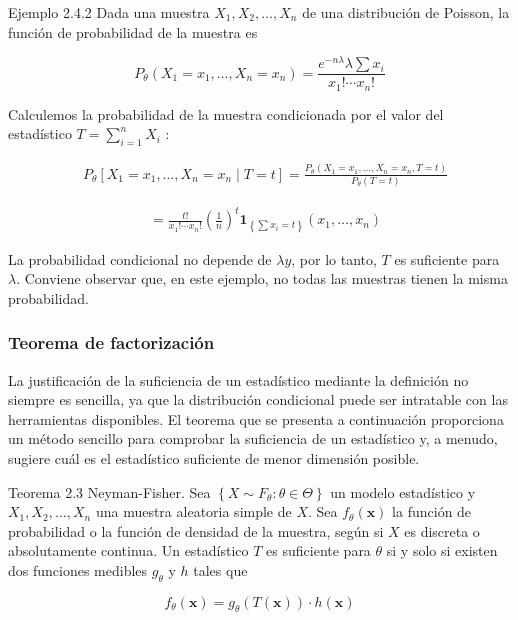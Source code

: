 \documentclass[
]{article}
\begin{document}
Ejemplo 2.4.2 Dada una muestra \(X_{1}, X_{2}, \ldots, X_{n}\) de una distribución de Poisson, la función de probabilidad de la muestra es

\[
P_{\theta}\left(X_{1}=x_{1}, \ldots, X_{n}=x_{n}\right)=\frac{e^{-n \lambda} \lambda \sum x_{i}}{x_{1}!\cdots x_{n}!}
\]

Calculemos la probabilidad de la muestra condicionada por el valor del estadístico \(T=\sum_{i=1}^{n} X_{i}\) :

\[
\begin{aligned}
& P_{\theta}\left[X_{1}=x_{1}, \ldots, X_{n}=x_{n} \mid T=t\right]=\frac{P_{\theta}\left(X_{1}=x_{1}, \ldots, X_{n}=x_{n}, T=t\right)}{P_{\theta}(T=t)}
\end{aligned}
\]

\[
\begin{aligned}
& =\frac{t!}{x_{1}!\cdots x_{n}!}\left(\frac{1}{n}\right)^{t} \mathbf{1}_{\left\{\sum x_{i}=t\right\}}\left(x_{1}, \ldots, x_{n}\right)
\end{aligned}
\]

La probabilidad condicional no depende de \(\lambda y\), por lo tanto, \(T\) es suficiente para \(\lambda\). Conviene observar que, en este ejemplo, no todas las muestras tienen la misma probabilidad.

\subsubsection{Teorema de factorización}\label{teorema-de-factorizaciuxf3n}

La justificación de la suficiencia de un estadístico mediante la definición no siempre es sencilla, ya que la distribución condicional puede ser intratable con las herramientas disponibles. El teorema que se presenta a continuación proporciona un método sencillo para comprobar la suficiencia de un estadístico y, a menudo, sugiere cuál es el estadístico suficiente de menor dimensión posible.

Teorema 2.3 Neyman-Fisher. Sea \(\left\{X \sim F_{\theta}: \theta \in \Theta\right\}\) un modelo estadístico y \(X_{1}, X_{2}, \ldots, X_{n}\) una muestra aleatoria simple de \(X\). Sea \(f_{\theta}(\mathbf{x})\) la función de probabilidad o la función de densidad de la muestra, según si \(X\) es discreta o absolutamente continua. Un estadístico \(T\) es suficiente para \(\theta\) si y solo si existen dos funciones medibles \(g_{\theta}\) y \(h\) tales que

\[
f_{\theta}(\mathbf{x})=g_{\theta}(T(\mathbf{x})) \cdot h(\mathbf{x})
\]
\end{document}
